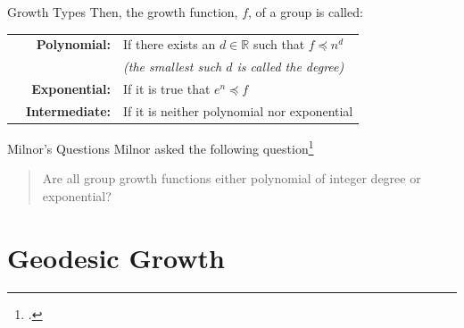 \documentclass{beamer}
\begin{document}
\begin{frame}{Growth Types}
Then, the growth function, $f$, of a group is called:

\begin{tabular}{c r l}
\quad&\textbf{Polynomial:}&
If there exists an $d \in \mathbb{R}$ such that $f \preccurlyeq n^d$
\\
&&\textit{(the smallest such $d$ is called the degree)}
\\[0.5em]
\quad&\textbf{Exponential:}&
If it is true that $e^n \preccurlyeq f$
\\[0.5em]
\quad&\textbf{Intermediate:}&
If it is neither polynomial nor exponential
\end{tabular}

\vspace{0.5cm}


\end{frame}



\begin{frame}{Milnor's Questions}
Milnor asked the following question\footcite{Milnor1968}

\begin{quotation}
	Are all group growth functions either polynomial of integer degree or exponential?
\end{quotation}

\vspace{0.25cm}


\vspace{0.25cm}


\end{frame}



\section{Geodesic Growth}
\end{document}
